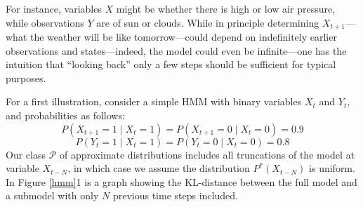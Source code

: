 \documentclass[10pt,letterpaper]{article}
\begin{document}
\begin{figure}[h] 
\begin{center}
\end{center} 
\end{figure} 
\noindent For instance, variables $X$ might be whether there is high or low air pressure, while observations $Y$ are of sun or clouds. While in principle determining $X_{t+1}$---what the weather will be like tomorrow---could depend on indefinitely earlier observations and states---indeed, the model could even be infinite---one has the intuition that ``looking back'' only a few steps should be sufficient for typical purposes.

For a first illustration, consider a simple HMM with binary variables $X_t$ and $Y_t$, and probabilities as follows:
$$P(X_{t+1}=1\mid X_t=1) = P(X_{t+1}=0\mid X_t=0) = 0.9$$
$$P(Y_{t}=1\mid X_t=1) = P(Y_{t}=0\mid X_t=0) = 0.8$$
Our class $\mathcal{P}$ of approximate distributions includes all truncations of the model at variable $X_{t-N}$, in which case we assume the distribution $P^{*}(X_{t-N})$ is uniform. In Figure \ref{hmm}1 is a graph showing the KL-distance between the full model and a submodel with only $N$ previous time steps included.
\end{document}

